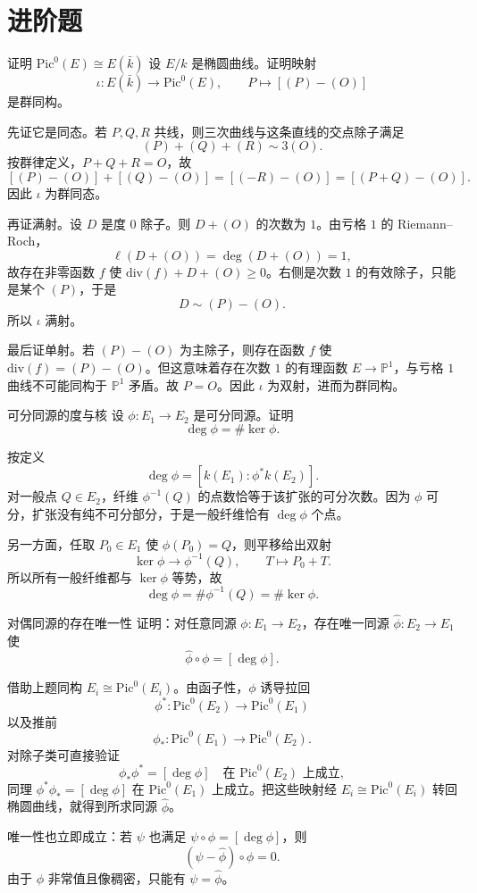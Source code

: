 \section*{进阶题}

\begin{problem}{证明 $\mathrm{Pic}^0(E)\cong E(\bar k)$ \medium}
设 $E/k$ 是椭圆曲线。证明映射
\[
\iota:E(\bar k)\longrightarrow \mathrm{Pic}^0(E),\qquad P\longmapsto [(P)-(O)]
\]
是群同构。
\end{problem}
\begin{solution}
先证它是同态。若 $P,Q,R$ 共线，则三次曲线与这条直线的交点除子满足
\[
(P)+(Q)+(R)\sim 3(O).
\]
按群律定义，$P+Q+R=O$，故
\[
[(P)-(O)]+[(Q)-(O)]=[( -R)-(O)]=[(P+Q)-(O)].
\]
因此 $\iota$ 为群同态。

再证满射。设 $D$ 是度 $0$ 除子。则 $D+(O)$ 的次数为 $1$。由亏格 $1$ 的 Riemann--Roch，
\[
\ell(D+(O))=\deg(D+(O))=1,
\]
故存在非零函数 $f$ 使 $\mathrm{div}(f)+D+(O)\ge 0$。右侧是次数 $1$ 的有效除子，只能是某个 $(P)$，于是
\[
D\sim (P)-(O).
\]
所以 $\iota$ 满射。

最后证单射。若 $(P)-(O)$ 为主除子，则存在函数 $f$ 使 $\mathrm{div}(f)=(P)-(O)$。但这意味着存在次数 $1$ 的有理函数 $E\to\mathbb P^1$，与亏格 $1$ 曲线不可能同构于 $\mathbb P^1$ 矛盾。故 $P=O$。因此 $\iota$ 为双射，进而为群同构。
\end{solution}

\begin{problem}{可分同源的度与核 \medium}
设 $\phi:E_1\to E_2$ 是可分同源。证明
\[
\deg\phi=\#\ker\phi.
\]
\end{problem}
\begin{solution}
按定义
\[
\deg\phi=[k(E_1):\phi^*k(E_2)].
\]
对一般点 $Q\in E_2$，纤维 $\phi^{-1}(Q)$ 的点数恰等于该扩张的可分次数。因为 $\phi$ 可分，扩张没有纯不可分部分，于是一般纤维恰有 $\deg\phi$ 个点。

另一方面，任取 $P_0\in E_1$ 使 $\phi(P_0)=Q$，则平移给出双射
\[
\ker\phi\longrightarrow \phi^{-1}(Q),\qquad T\longmapsto P_0+T.
\]
所以所有一般纤维都与 $\ker\phi$ 等势，故
\[
\deg\phi=\#\phi^{-1}(Q)=\#\ker\phi.
\]
\end{solution}

\begin{problem}{对偶同源的存在唯一性 \medium}
证明：对任意同源 $\phi:E_1\to E_2$，存在唯一同源 $\hat\phi:E_2\to E_1$ 使
\[
\hat\phi\circ\phi=[\deg\phi].
\]
\end{problem}
\begin{solution}
借助上题同构 $E_i\cong \mathrm{Pic}^0(E_i)$。由函子性，$\phi$ 诱导拉回
\[
\phi^*: \mathrm{Pic}^0(E_2)\to \mathrm{Pic}^0(E_1)
\]
以及推前
\[
\phi_*: \mathrm{Pic}^0(E_1)\to \mathrm{Pic}^0(E_2).
\]
对除子类可直接验证
\[
\phi_*\phi^*=[\deg\phi]
\quad\text{在 }\mathrm{Pic}^0(E_2)\text{ 上成立},
\]
同理 $\phi^*\phi_*=[\deg\phi]$ 在 $\mathrm{Pic}^0(E_1)$ 上成立。把这些映射经
$E_i\cong\mathrm{Pic}^0(E_i)$ 转回椭圆曲线，就得到所求同源 $\hat\phi$。

唯一性也立即成立：若 $\psi$ 也满足 $\psi\circ\phi=[\deg\phi]$，则
\[
(\psi-\hat\phi)\circ\phi=0.
\]
由于 $\phi$ 非常值且像稠密，只能有 $\psi=\hat\phi$。
\end{solution}

